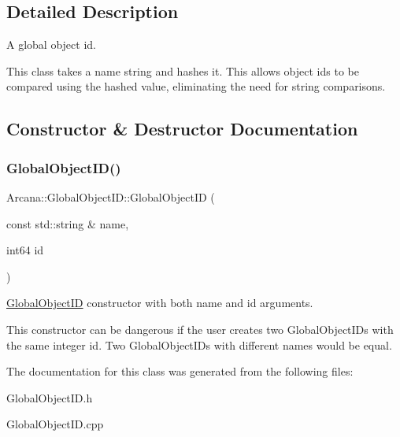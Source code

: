 \subsection{Detailed Description}
A global object id. 

This class takes a name string and hashes it. This allows object ids to be compared using the hashed value, eliminating the need for string comparisons. 

\subsection{Constructor \& Destructor Documentation}
\mbox{\label{class_arcana_1_1_global_object_i_d_a85279618fe9f94d268db594a2d07ab2a}} 
\subsubsection{\texorpdfstring{Global\+Object\+I\+D()}{GlobalObjectID()}}
{\footnotesize\ttfamily Arcana\+::\+Global\+Object\+I\+D\+::\+Global\+Object\+ID (\begin{DoxyParamCaption}\item[{const std\+::string \&}]{name,  }\item[{int64}]{id }\end{DoxyParamCaption})}



\mbox{\hyperlink{class_arcana_1_1_global_object_i_d}{Global\+Object\+ID}} constructor with both name and id arguments. 

This constructor can be dangerous if the user creates two Global\+Object\+I\+Ds with the same integer id. Two Global\+Object\+I\+Ds with different names would be equal. 

The documentation for this class was generated from the following files\+:\begin{DoxyCompactItemize}
\item 
Global\+Object\+I\+D.\+h\item 
Global\+Object\+I\+D.\+cpp\end{DoxyCompactItemize}
